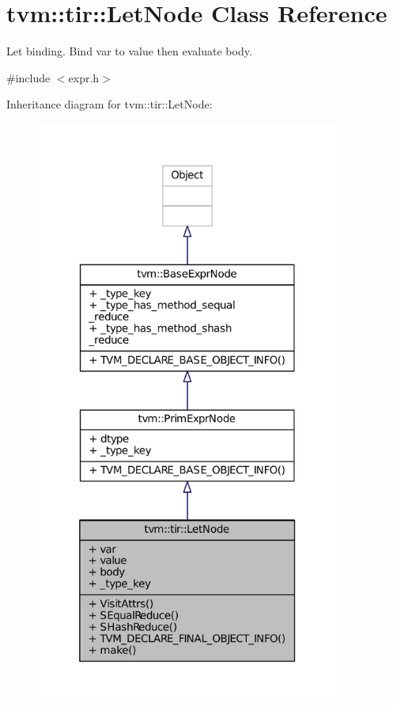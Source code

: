 \hypertarget{classtvm_1_1tir_1_1LetNode}{}\section{tvm\+:\+:tir\+:\+:Let\+Node Class Reference}
\label{classtvm_1_1tir_1_1LetNode}


Let binding. Bind var to value then evaluate body.  




{\ttfamily \#include $<$expr.\+h$>$}



Inheritance diagram for tvm\+:\+:tir\+:\+:Let\+Node\+:
\nopagebreak
\begin{figure}[H]
\begin{center}
\leavevmode
\includegraphics[height=550pt]{classtvm_1_1tir_1_1LetNode__inherit__graph}
\end{center}
\end{figure}


